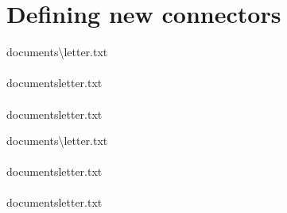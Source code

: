 \documentclass{article}
\begin{document}
\section{Defining new connectors}

\begin{verbatim*}
\DeclareConnectors{\bwdslash}{\nbbwdslash}{\textbackslash\penalty\exhyphenpenalty}
\begin{minipage}{0pt}
do\-cu\-ments\textbackslash\penalty\exhyphenpenalty{}letter.txt\\\\
do\-cu\-ments\bwdslash{}letter.txt\\\\
do\-cu\-ments\nbbwdslash{}letter.txt\\
\end{minipage}
\end{verbatim*}
%
\DeclareConnectors{\bwdslash}{\nbbwdslash}{\textbackslash\penalty\exhyphenpenalty}
\begin{minipage}{0pt}
  do\-cu\-ments\textbackslash\penalty\exhyphenpenalty{}letter.txt\\\\
  do\-cu\-ments\bwdslash{}letter.txt\\\\
  do\-cu\-ments\nbbwdslash{}letter.txt\\
\end{minipage}
\end{document}
